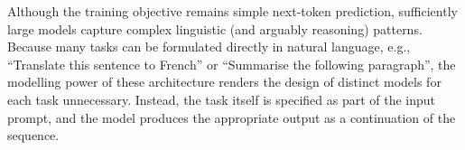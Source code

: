 Although the training objective remains simple next-token prediction, sufficiently large models capture complex linguistic (and arguably reasoning) patterns. Because many tasks can be formulated directly in natural language, e.g., ``Translate this sentence to French'' or ``Summarise the following paragraph'', the modelling power of these architecture renders the design of distinct models for each task unnecessary. Instead, the task itself is specified as part of the input prompt, and the model produces the appropriate output as a continuation of the sequence.



